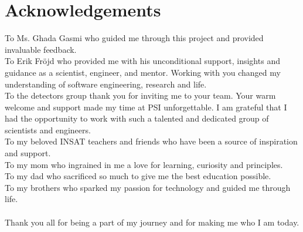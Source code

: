 \chapter*{Acknowledgements}

To Ms. Ghada Gasmi who guided me through this project and provided invaluable feedback.\\

To Erik Fröjd who provided me with his unconditional support, insights and guidance as a 
scientist, engineer, and mentor. Working with you changed my understanding of software 
engineering, research and life. \\

To the detectors group thank you for inviting me to your team. Your warm welcome and
support made my time at PSI unforgettable. I am grateful that I had the opportunity to work
with such a talented and dedicated group of scientists and engineers.\\

To my beloved INSAT teachers and friends who have been a source of inspiration and support.\\

To my mom who ingrained in me a love for learning, curiosity and principles.\\

To my dad who sacrificed so much to give me the best education possible.\\

To my brothers who sparked my passion for technology and guided me through life.\\ \\

Thank you all for being a part of my journey and for making me who I am today.\\